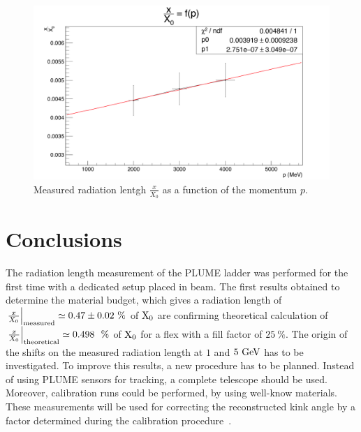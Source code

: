    \begin{figure}
     \centering
     \includegraphics[width =\textwidth]{Pictures/X0/radiationLength_2-4GeV.png}
     \caption{Measured radiation lentgh $\frac{x}{X_0}$ as a function of the momentum $p$.}
     \label{fig:X0vsP}
   \end{figure}

  \section{Conclusions}

  The radiation length measurement of the \gls{PLUME} ladder was performed for the first time with a dedicated setup placed in beam.
  The first results obtained to determine the material budget, which gives a radiation length of $\left. \frac{x}{X_0} \right|_{\rm{measured}} \simeq 0.47 \pm 0.02~\%$ of $\rm{X_0}$ are confirming theoretical calculation of $\left. \frac{x}{X_0}\right|_{\rm{theoretical}} \simeq 0.498~~\%$ of $\rm{X_0}$ for a flex with a fill factor of $25~\%$.
  The origin of the shifts on the measured radiation length at $1$ and $5~\rm{GeV}$ has to be investigated.
  To improve this results, a new procedure has to be planned.
  Instead of using \gls{PLUME} sensors for tracking, a complete telescope should be used.
  Moreover, calibration runs could be performed, by using well-know materials.
  These measurements will be used for correcting the reconstructed kink angle by a factor determined during the calibration procedure~\cite{Stolzenberg:2016hrj}.

